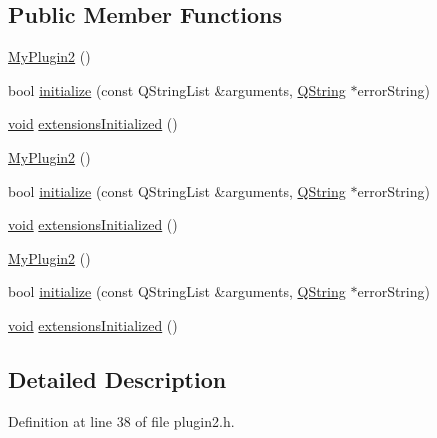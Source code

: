 \subsection*{Public Member Functions}
\begin{DoxyCompactItemize}
\item 
\hyperlink{class_plugin2_1_1_my_plugin2_a5c22d36752f6536ba52762d59868b8dc}{My\-Plugin2} ()
\item 
bool \hyperlink{class_plugin2_1_1_my_plugin2_a07363358acc9f69b85d01098a5651001}{initialize} (const Q\-String\-List \&arguments, \hyperlink{group___u_a_v_objects_plugin_gab9d252f49c333c94a72f97ce3105a32d}{Q\-String} $\ast$error\-String)
\item 
\hyperlink{group___u_a_v_objects_plugin_ga444cf2ff3f0ecbe028adce838d373f5c}{void} \hyperlink{class_plugin2_1_1_my_plugin2_af7d34ae6f055b086ad23af98ffedc641}{extensions\-Initialized} ()
\item 
\hyperlink{class_plugin2_1_1_my_plugin2_a448298d79c5c8340ee73e9e111f8f36e}{My\-Plugin2} ()
\item 
bool \hyperlink{class_plugin2_1_1_my_plugin2_a916f4fbb7e5464477ce2dcdaa416d286}{initialize} (const Q\-String\-List \&arguments, \hyperlink{group___u_a_v_objects_plugin_gab9d252f49c333c94a72f97ce3105a32d}{Q\-String} $\ast$error\-String)
\item 
\hyperlink{group___u_a_v_objects_plugin_ga444cf2ff3f0ecbe028adce838d373f5c}{void} \hyperlink{class_plugin2_1_1_my_plugin2_a9c07bb7d949169532e7a1ba2cdccdf49}{extensions\-Initialized} ()
\item 
\hyperlink{class_plugin2_1_1_my_plugin2_a448298d79c5c8340ee73e9e111f8f36e}{My\-Plugin2} ()
\item 
bool \hyperlink{class_plugin2_1_1_my_plugin2_a916f4fbb7e5464477ce2dcdaa416d286}{initialize} (const Q\-String\-List \&arguments, \hyperlink{group___u_a_v_objects_plugin_gab9d252f49c333c94a72f97ce3105a32d}{Q\-String} $\ast$error\-String)
\item 
\hyperlink{group___u_a_v_objects_plugin_ga444cf2ff3f0ecbe028adce838d373f5c}{void} \hyperlink{class_plugin2_1_1_my_plugin2_a9c07bb7d949169532e7a1ba2cdccdf49}{extensions\-Initialized} ()
\end{DoxyCompactItemize}


\subsection{Detailed Description}


Definition at line 38 of file plugin2.\-h.




